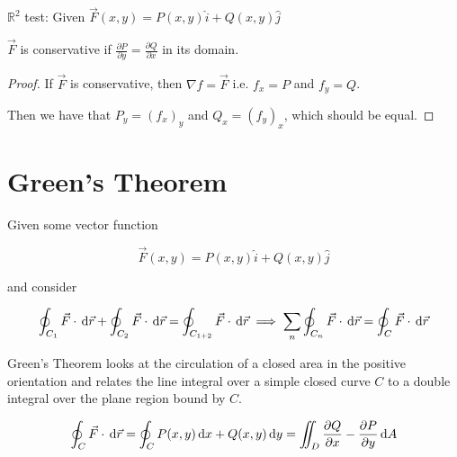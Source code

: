 \begin{lemma}
	$\mathbb{R}^2$ test: Given $\vec F(x, y) = P(x, y) \hat i + Q(x, y) \hat j$

	$\vec F$ is conservative if $\frac{\partial P}{\partial y} = \frac{\partial Q}{\partial x}$ in its domain.
\end{lemma}

\begin{proof}
	If $\vec F$ is conservative, then $\nabla f = \vec F$ i.e. $f_x = P$ and $f_y = Q$.

	Then we have that $P_y = (f_x)_y$ and $Q_x = (f_y)_x$, which should be equal.
\end{proof}

\section{Green's Theorem}

Given some vector function

\begin{equation}
	\vec F(x, y) = P(x, y) \hat i + Q(x, y) \hat j
\end{equation}

and consider

\begin{equation}
	\oint_{C_1} \vec F \cdot \D \vec r + \oint_{C_2} \vec F \cdot \D \vec r = \oint_{C_{1+2}} \vec F \cdot \D \vec r \implies \sum_n \oint_{C_n} \vec F \cdot \D \vec r = \oint_C \vec F \cdot \D \vec r
\end{equation}

Green's Theorem looks at the circulation of a closed area in the positive orientation and relates the line integral over a simple closed curve $C$ to a double integral over the plane region bound by $C$.

\begin{theorem}
	\begin{equation}
		\oint_C \vec F \cdot \D \vec r = \oint_C P(x, y) \D x + Q(x, y) \D y = \iint_D \frac{\partial Q}{\partial x} - \frac{\partial P}{\partial y} \D A
	\end{equation}
\end{theorem}